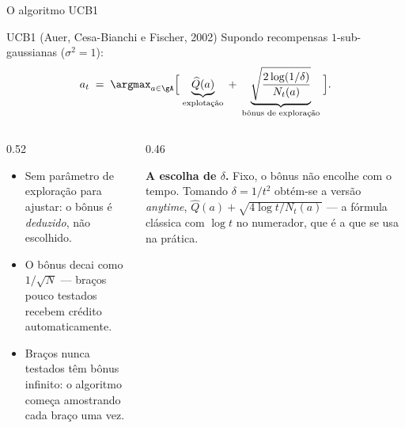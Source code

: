 \documentclass[aspectratio=169, 10pt]{beamer}
\newcommand{\Qhat}{\widehat{Q}}
\newcommand{\Nc}{N}                         %
\begin{document}
\begin{frame}{O algoritmo UCB1}
  \begin{algbox}{UCB1 (Auer, Cesa-Bianchi e Fischer, 2002)}
    Supondo recompensas $1$-sub-gaussianas ($\sigma^2 = 1$):
    \[
      a_t \;=\; \argmax_{a \in \gA}
        \Bigl[\; \underbrace{\Qhat(a)}_{\text{explotação}}
        \;+\; \underbrace{\sqrt{\frac{2\log(1/\delta)}{\Nc_t(a)}}}_{\text{bônus de exploração}} \;\Bigr].
    \]
  \end{algbox}

  \begin{columns}[T]
    \begin{column}{0.52\textwidth}
      \begin{itemize}
        \item Sem parâmetro de exploração para ajustar: o bônus é
              \emph{deduzido}, não escolhido.
        \item O bônus decai como $1/\sqrt{\Nc}$ --- braços pouco testados
              recebem crédito automaticamente.
        \item Braços nunca testados têm bônus infinito: o algoritmo começa
              amostrando cada braço uma vez.
      \end{itemize}
    \end{column}
    \begin{column}{0.46\textwidth}
      \begin{ideiabox}
        \textbf{A escolha de $\delta$.} Fixo, o bônus não encolhe com o
        tempo. Tomando $\delta = 1/t^2$ obtém-se a versão \emph{anytime},
        $\Qhat(a) + \sqrt{4\log t / \Nc_t(a)}$ --- a fórmula clássica com
        $\log t$ no numerador, que é a que se usa na prática.
      \end{ideiabox}
    \end{column}
  \end{columns}
\end{frame}
\end{document}
